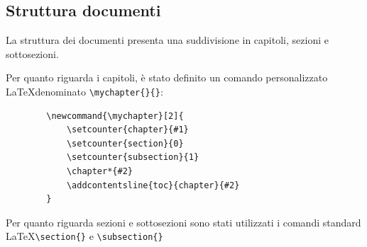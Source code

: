 \documentclass[a4paper]{report}
\newcommand{\mychapter}[2]{
	\setcounter{chapter}{#1}
	\setcounter{section}{0}
	\setcounter{subsection}{1}
	\chapter*{#2}
	\addcontentsline{toc}{chapter}{#2}
}
\begin{document}
	\subsection{Struttura documenti}
	La struttura dei documenti presenta una suddivisione in capitoli, sezioni e sottosezioni. 
	
	Per quanto riguarda i capitoli, è stato definito un comando personalizzato \LaTeX \space denominato
	\verb|\mychapter{}{}|:
	\begin{verbatim}
		\newcommand{\mychapter}[2]{
			\setcounter{chapter}{#1}
			\setcounter{section}{0}
			\setcounter{subsection}{1}
			\chapter*{#2}
			\addcontentsline{toc}{chapter}{#2}
		}
	\end{verbatim}
	Per quanto riguarda sezioni e sottosezioni sono stati utilizzati i comandi standard \LaTeX \verb|\section{}| e
	\verb|\subsection{}| 
\end{document}
